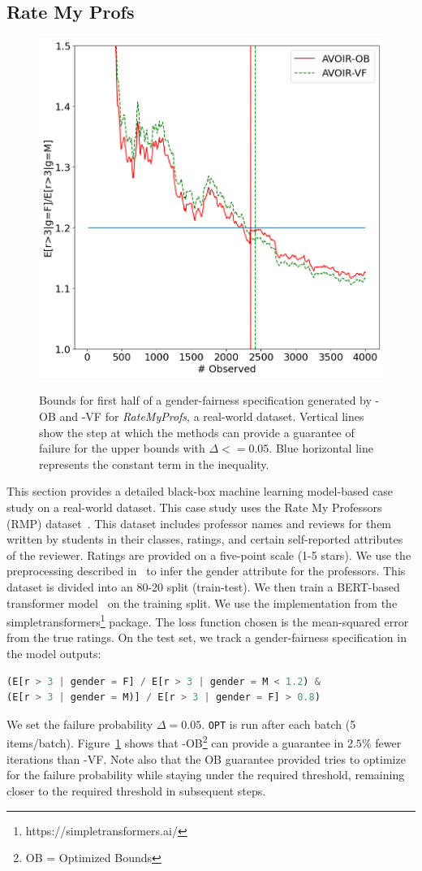 \subsection{Rate My Profs}
\label{sec:casestudy:rmp}
\begin{figure}
    \centering
    \includegraphics[width=0.5\linewidth,alt={Line plot showing the upper bound of the first half of a gender fairness specification for the RateMyProfs dataset. Our optimized \AVOIRmethodname{}-OB achieves the bound using fewer samples.}]{avoir/images/ratemyprofs.png}
    \caption{Bounds for first half of a gender-fairness specification generated by \AVOIRmethodname{}-OB and \AVOIRmethodname{}-VF for \textit{RateMyProfs}, a real-world dataset. Vertical lines show the step at which the methods can provide a guarantee of failure for the upper bounds with $\Delta <= 0.05$. Blue horizontal line represents the constant term in the inequality.}
    \label{fig:casestudy:rmp}
\end{figure}
This section provides a detailed black-box machine learning model-based case study on a real-world dataset.
This case study uses the Rate My Professors (RMP) dataset~\cite{keymanesh2021fairness}. 
This dataset includes professor names and reviews for them written by students in their classes, ratings, and certain self-reported attributes of the reviewer.
Ratings are provided on a five-point scale (1-5 stars).
We use the preprocessing described in~\cite{keymanesh2021fairness} to infer the gender attribute for the professors.
This dataset is divided into an 80-20 split (train-test).
We then train a BERT-based transformer model~\cite{devlin2019bert} on the training split.
We use the implementation from the simpletransformers\footnote{https://simpletransformers.ai/} package.
The loss function chosen is the mean-squared error from the true ratings.
On the test set, we track a gender-fairness specification in the model outputs:
\begin{lstlisting}[columns=flexible, language=Python, basicstyle=\small]
(E[r > 3 | gender = F] / E[r > 3 | gender = M < 1.2) & 
(E[r > 3 | gender = M)] / E[r > 3 | gender = F] > 0.8)
\end{lstlisting}
We set the failure probability $\Delta = 0.05$. 
\texttt{OPT} is run after each batch (5 items/batch).
Figure~\ref{fig:casestudy:rmp} shows that \AVOIRmethodname{}-OB\footnote{OB = Optimized Bounds} can provide a guarantee in $\mathbf{2.5\%}$ fewer iterations than \AVOIRmethodname{}-VF. 
Note also that the OB guarantee provided tries to optimize for the failure probability while staying under the required threshold, remaining closer to the required threshold in subsequent steps.


